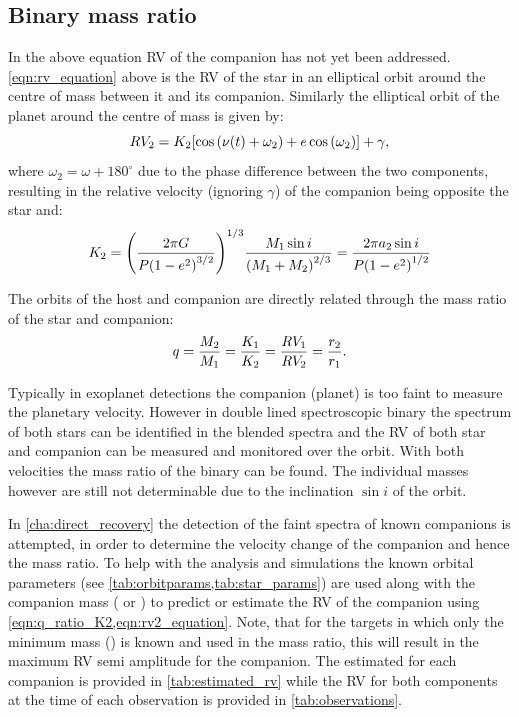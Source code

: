 \subsection{Binary mass ratio}
\label{subsec:binary_mass_ratio}
In the above equation {RV} of the companion has not yet been addressed.
\cref{eqn:rv_equation} above is the {RV} of the star in an elliptical orbit around the centre of mass between it and its companion.
Similarly the elliptical orbit of the planet around the centre of mass is given by:
\begin{equation}
    {RV_{2}} = {K}_{2}{} [\cos{(\nu(t) + \omega_{2})} + e\cos{(\omega_{2})}] + \gamma, \label{eqn:rv2_equation}
\end{equation}
where \(\omega_{2} = \omega + 180^\circ\) due to the phase difference between the two components, resulting in the relative velocity (ignoring \(\gamma\)) of the companion being opposite the star and:
\begin{equation}
    {K}_{2}  = {\left(  \frac{2 \pi G}{P{(1 - {e}^{2})}^{3/2}} \right)}^{1/3} \frac{{M}_{1} \sin{i}}{{({M}_{1} + {M}_{2})}^{2/3}} = \frac{2 \pi a_2 \sin{i}}{P{(1 - {e}^{2})}^{1/2}} \label{eqn:ktwo}
\end{equation}

The orbits of the host and companion are directly related through the mass ratio of the star and companion:
\begin{equation}
q = \frac{{M}_{2}}{{M}_{1}} = \frac{{K}_{1}}{{K}_{2}} = \frac{RV_{1}}{RV_{2}} = \frac{r_2}{r_1} \label{eqn:q_ratio_K2}.
\end{equation}

Typically in exoplanet detections the companion (planet) is too faint to measure the planetary velocity.
However in double lined spectroscopic binary the spectrum of both stars can be identified in the blended spectra and the {RV} of both star and companion can be measured and monitored over the orbit.
With both velocities the mass ratio of the binary can be found.
The individual masses however are still not determinable due to the inclination $\sin{i}$ of the orbit.

In \cref{cha:direct_recovery} the detection of the faint spectra of known companions is attempted, in order to determine the velocity change of the companion and hence the mass ratio.
To help with the analysis and simulations the known orbital parameters (see \cref{tab:orbitparams,tab:star_params}) are used along with the companion mass (\Mtwo{} or \Mtwosini{}) to predict or estimate the {RV} of the companion using \cref{eqn:q_ratio_K2,eqn:rv2_equation}.
Note, that for the targets in which only the minimum mass (\Mtwosini{}) is known and used in the mass ratio, this will result in the maximum {RV} semi amplitude for the companion.
The estimated \Ktwo{} for each companion is provided in \cref{tab:estimated_rv} while the {RV} for both components at the time of each observation is provided in \cref{tab:observations}.
